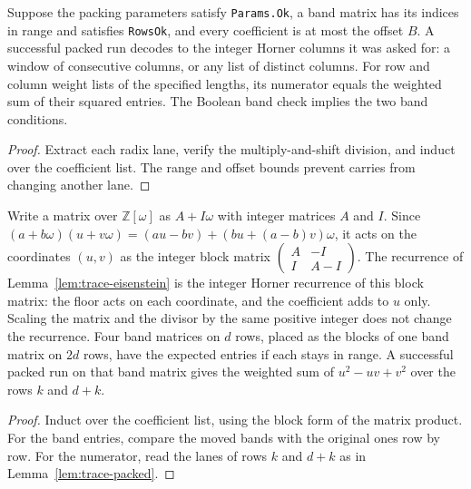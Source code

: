 \begin{lemma}
  \label{lem:trace-packed}
  \leanok
  Suppose the packing parameters satisfy \texttt{Params.Ok}, a band matrix has its indices
  in range and satisfies \texttt{RowsOk}, and every coefficient is at most the offset \(B\).
  A successful packed run decodes to the integer Horner columns it was asked for: a window of
  consecutive columns, or any list of distinct columns.
  For row and column weight lists of the specified lengths, its numerator equals the weighted
  sum of their squared entries.
  The Boolean band check implies the two band conditions.
\end{lemma}
\begin{proof}
  \leanok
  Extract each radix lane, verify the multiply-and-shift division, and induct over the
  coefficient list. The range and offset bounds prevent carries from changing another lane.
\end{proof}

\begin{lemma}
  \label{lem:trace-realify}
  \leanok
  Write a matrix over \(\mathbb Z[\omega]\) as \(A+I\omega\) with integer matrices \(A\) and
  \(I\). Since \((a+b\omega)(u+v\omega)=(au-bv)+(bu+(a-b)v)\omega\), it acts on the coordinates
  \((u,v)\) as the integer block matrix
  \(\left(\begin{smallmatrix}A&-I\\I&A-I\end{smallmatrix}\right)\).
  The recurrence of Lemma~\ref{lem:trace-eisenstein} is the integer Horner recurrence of this
  block matrix: the floor acts on each coordinate, and the coefficient adds to \(u\) only.
  Scaling the matrix and the divisor by the same positive integer does not change the
  recurrence. Four band matrices on \(d\) rows, placed as the blocks of one band matrix on
  \(2d\) rows, have the expected entries if each stays in range. A successful packed run on
  that band matrix gives the weighted sum of \(u^2-uv+v^2\) over the rows \(k\) and \(d+k\).
\end{lemma}
\begin{proof}
  \leanok
  Induct over the coefficient list, using the block form of the matrix product. For the band
  entries, compare the moved bands with the original ones row by row. For the numerator, read
  the lanes of rows \(k\) and \(d+k\) as in Lemma~\ref{lem:trace-packed}.
\end{proof}

